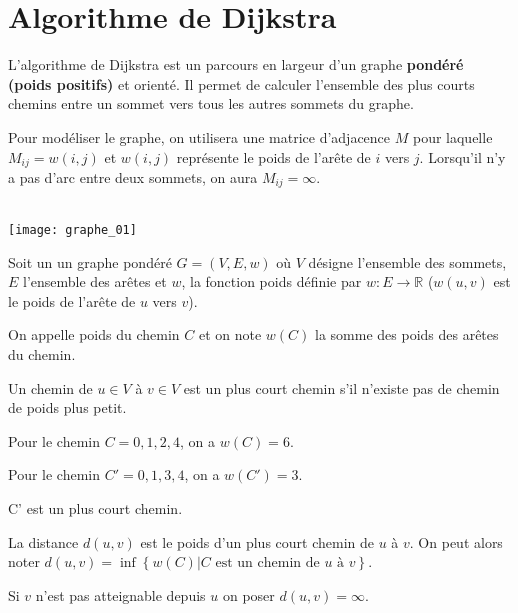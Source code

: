 \section{Algorithme de Dijkstra}


L'algorithme de Dijkstra est un parcours en largeur d'un graphe \textbf{pondéré (poids positifs)} et orienté. Il permet de calculer l'ensemble des plus courts chemins entre un sommet vers tous les autres sommets du graphe.

Pour modéliser le graphe, on utilisera une matrice d'adjacence $M$ pour laquelle $M_{ij}=w(i,j)$ et $w(i,j)$ représente le poids de l'arête de $i$ vers $j$. Lorsqu'il n'y a pas d'arc entre deux sommets, on aura $M_{ij}=\infty$.

\begin{exemple}  ~\\
\texttt{[image: graphe\_01]}
\end{exemple}

\begin{defi}
Soit un un graphe pondéré $G=\left(V, E, w\right)$ où $V$ désigne l'ensemble des sommets, $E$ l'ensemble des arêtes et 
$w$, la fonction poids définie par $w : E \rightarrow \mathbb{R}$ ($w(u, v)$ est le poids de l’arête de $u$ vers $v$).

On appelle poids du chemin $C$ et on note $w(C)$ la somme des poids des arêtes du chemin. 

Un chemin de $u\in V$ à $v\in V$ est un plus court chemin s'il n'existe pas de chemin de poids plus petit. 
\end{defi}


\begin{exemple}
Pour le chemin $C = 0, 1,2,4$, on a $w(C)=6$. 

Pour le chemin $C' = 0, 1,3,4$, on a $w(C')=3$. 

C' est un plus court chemin. 
\end{exemple}

\begin{defi}[Distance]
La distance $d\left(u,v\right)$ est le poids d'un plus court chemin de $u$ à $v$. On peut alors noter 
$d(u,v)=\inf\left\{
w(C) | C \text{ est un chemin de } u \text{ à } v
\right\}$.

Si $v$  n'est pas atteignable depuis $u$ on poser $d(u,v)=\infty$.

\end{defi}

